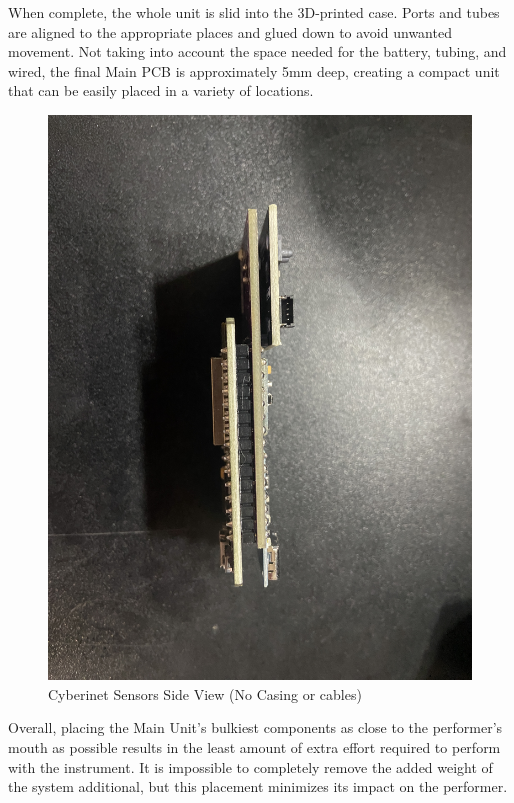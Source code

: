 When complete, the whole unit is slid into the 3D-printed case. Ports and tubes are aligned to the appropriate places and glued down to avoid unwanted movement. Not taking into account the space needed for the battery, tubing, and wired, the final Main PCB is approximately 5mm deep, creating a compact unit that can be easily placed in a variety of locations.

\begin{center}
    \begin{figure}
        \centering
        \includegraphics[scale=0.05]{diagrams/PCBs/cyberinetThin.JPG}
        \caption{Cyberinet Sensors Side View (No Casing or cables)}
        \label{fig:Cyberinetside}
    \end{figure}
\end{center}


Overall, placing the Main Unit's bulkiest components as close to the performer's mouth as possible results in the least amount of extra effort required to perform with the instrument. It is impossible to completely remove the added weight of the system additional, but this placement minimizes its impact on the performer.


